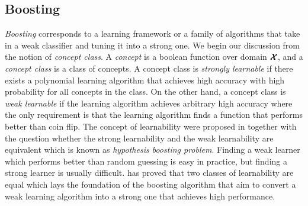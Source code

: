 {\subsection{Boosting}
\textit{Boosting} corresponds to a learning framework or a family of algorithms that take in a weak classifier and tuning it into a strong one.
We begin our discussion from the notion of  \textit{concept class}.
A \textit{concept} is a boolean function over domain $\pmb {\mathcal{X}}$, and a \textit{concept class} is a class of concepts.
A concept class is \textit{strongly learnable} if there exists a polynomial learning algorithm that achieves high accuracy with high probability for all concepts in the class.
On the other hand, a concept class is \textit{weak learnable} if the learning algorithm achieves arbitrary high accuracy where the only requirement is that the learning algorithm finds a function that performs better than coin flip.
The concept of learnability were proposed in \citep{Kearns94cryptographic} together with the question whether the strong learnability and the weak learnability are equivalent which is known as \textit{hypothesis boosting problem}.
Finding a weak learner which performs better than random guessing is easy in practice, but finding a strong learner is usually difficult.
\citet{Schapire90the} has proved that two classes of learnability are equal which lays the foundation of the boosting algorithm that aim to convert a weak learning algorithm into a strong one that achieves high performance.

}
